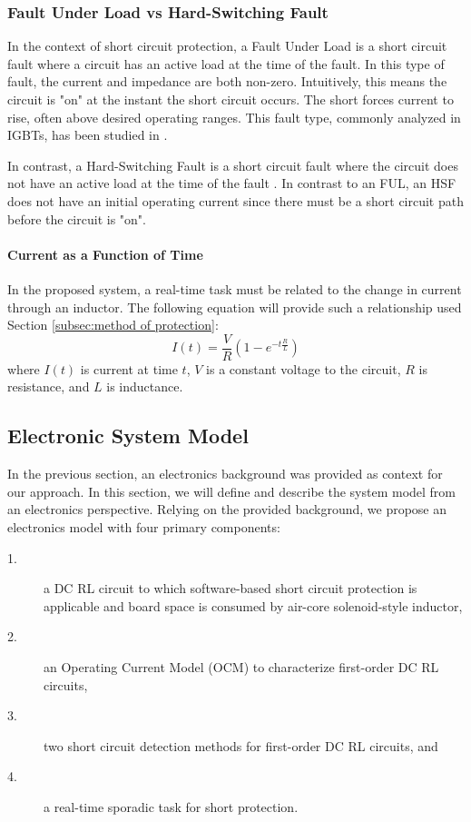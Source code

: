 \subsubsection{Fault Under Load vs Hard-Switching Fault}
In the context of short circuit protection, a Fault Under Load is a short circuit fault where a circuit has an active load at the time of the fault.
In this type of fault, the current and impedance are both non-zero.
Intuitively, this means the circuit is "on" at the instant the short circuit occurs.
The short forces current to rise, often above desired operating ranges.
This fault type, commonly analyzed in IGBTs, has been studied in \cite{pagano_short_2005}.

In contrast, a Hard-Switching Fault is a short circuit fault where the circuit does not have an active load at the time of the fault \cite{horiguchi_high-speed_2015}.
In contrast to an FUL, an HSF does not have an initial operating current since there must be a short circuit path before the circuit is "on".

\paragraph{Current as a Function of Time}
In the proposed system, a real-time task must be related to the change in current through an inductor.
The following equation will provide such a relationship used Section \ref{subsec:method of protection}:
\begin{equation}\label{eq:CurrentAtTime}
I(t) = \frac{V}{R}(1-e^{-t \frac{R}{L}})
\end{equation}
where $I(t)$ is current at time $t$, $V$ is a constant voltage to the circuit, $R$ is resistance, and $L$ is inductance.
\clearpage \subsection{Electronic System Model}\label{subsec:electronic system model}
In the previous section, an electronics background was provided as context for our approach.
In this section, we will define and describe the system model from an electronics perspective.
Relying on the provided background, we propose an electronics model with four primary components:
\begin{description}
\item [1.] a DC RL circuit to which software-based short circuit protection is applicable and board space is consumed by air-core solenoid-style inductor,
\item [2.] an Operating Current Model (OCM) to characterize first-order DC RL circuits,
\item [3.] two short circuit detection methods for first-order DC RL circuits, and
\item [4.] a real-time sporadic task for short protection.
\end{description}

